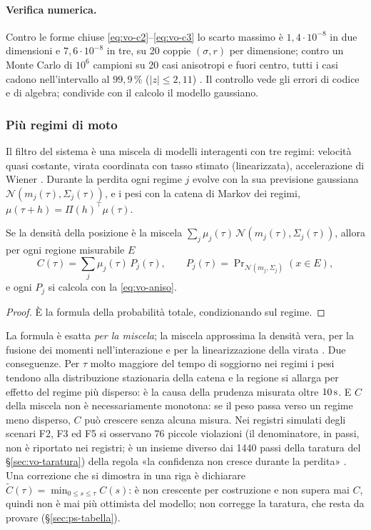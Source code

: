 \paragraph{Verifica numerica.} Contro le forme chiuse \eqref{eq:vo-c2}--\eqref{eq:vo-c3} lo scarto massimo è $1{,}4\cdot10^{-8}$ in due dimensioni e $7{,}6\cdot10^{-8}$ in tre, su 20 coppie $(\sigma,r)$ per dimensione; contro un Monte Carlo di $10^6$ campioni su 20 casi anisotropi e fuori centro, tutti i casi cadono nell'intervallo al $99{,}9\,\%$ ($|z|\le2{,}11$) . Il controllo vede gli errori di codice e di algebra; condivide con il calcolo il modello gaussiano.

\subsubsection{Più regimi di moto}\label{sec:vo-c-imm}

Il filtro del sistema è una miscela di modelli interagenti \cite{blom1988,mazor1998,barshalom2001} con tre regimi: velocità quasi costante, virata coordinata con tasso stimato (linearizzata), accelerazione di Wiener \cite{li2003}. Durante la perdita ogni regime $j$ evolve con la sua previsione gaussiana $\mathcal N(m_j(\tau),\Sigma_j(\tau))$, e i pesi con la catena di Markov dei regimi, $\mu(\tau+h)=\Pi(h)^\top\mu(\tau)$.

\begin{proposizione}\label{prop:vo-imm}
Se la densità della posizione è la miscela $\sum_j\mu_j(\tau)\,\mathcal N(m_j(\tau),\Sigma_j(\tau))$, allora per ogni regione misurabile $E$
\[C(\tau)=\sum_j\mu_j(\tau)\,P_j(\tau),\qquad P_j(\tau)=\Pr\nolimits_{\mathcal N(m_j,\Sigma_j)}(x\in E),\]
e ogni $P_j$ si calcola con la \eqref{eq:vo-aniso}.
\end{proposizione}
\begin{proof}
È la formula della probabilità totale, condizionando sul regime.
\end{proof}
La formula è esatta \emph{per la miscela}; la miscela approssima la densità vera, per la fusione dei momenti nell'interazione e per la linearizzazione della virata . Due conseguenze. Per $\tau$ molto maggiore del tempo di soggiorno nei regimi i pesi tendono alla distribuzione stazionaria della catena e la regione si allarga per effetto del regime più disperso: è la causa della prudenza misurata oltre $10\,\mathrm{s}$. E $C$ della miscela non è necessariamente monotona: se il peso passa verso un regime meno disperso, $C$ può crescere senza alcuna misura. Nei registri simulati degli scenari F2, F3 ed F5 si osservano 76 piccole violazioni (il denominatore, in passi, non è riportato nei registri; è un insieme diverso dai 1440 passi della taratura del \S\ref{sec:vo-taratura}) della regola «la confidenza non cresce durante la perdita» . Una correzione che si dimostra in una riga è dichiarare $\tilde C(\tau)=\min_{0\le s\le\tau}C(s)$: è non crescente per costruzione e non supera mai $C$, quindi non è mai più ottimista del modello; non corregge la taratura, che resta da provare (\S\ref{sec:ps-tabella}).

